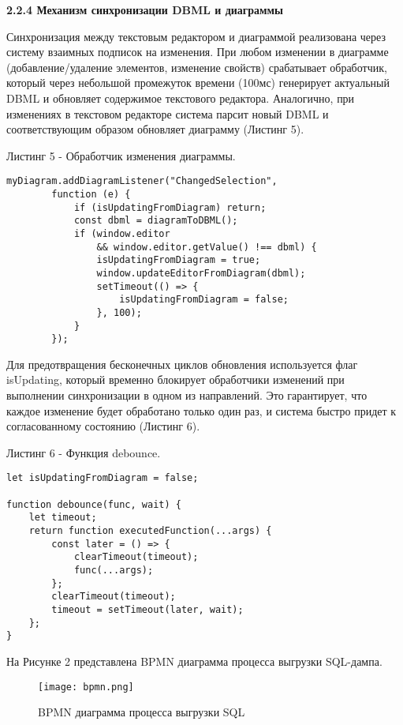 \textbf{\large 2.2.4 Механизм синхронизации DBML и диаграммы}

Синхронизация между текстовым редактором и диаграммой реализована через систему взаимных подписок на изменения. При любом изменении в диаграмме (добавление/удаление элементов, изменение свойств) срабатывает обработчик, который через небольшой промежуток времени (100мс) генерирует актуальный DBML и обновляет содержимое текстового редактора. Аналогично, при изменениях в текстовом редакторе система парсит новый DBML и соответствующим образом обновляет диаграмму (Листинг 5).

Листинг 5 - Обработчик изменения диаграммы.
\begin{lstlisting}[frame=single]
    myDiagram.addDiagramListener("ChangedSelection",
        function (e) {
            if (isUpdatingFromDiagram) return;
            const dbml = diagramToDBML();
            if (window.editor
                && window.editor.getValue() !== dbml) {
                isUpdatingFromDiagram = true;
                window.updateEditorFromDiagram(dbml);
                setTimeout(() => {
                    isUpdatingFromDiagram = false;
                }, 100);
            }
        });
\end{lstlisting}

Для предотвращения бесконечных циклов обновления используется флаг isUpdating, который временно блокирует обработчики изменений при выполнении синхронизации в одном из направлений. Это гарантирует, что каждое изменение будет обработано только один раз, и система быстро придет к согласованному состоянию (Листинг 6).

Листинг 6 - Функция debounce.
\begin{lstlisting}[frame=single]
let isUpdatingFromDiagram = false;

function debounce(func, wait) {
    let timeout;
    return function executedFunction(...args) {
        const later = () => {
            clearTimeout(timeout);
            func(...args);
        };
        clearTimeout(timeout);
        timeout = setTimeout(later, wait);
    };
}
\end{lstlisting}

На Рисунке 2 представлена BPMN диаграмма процесса выгрузки SQL-дампа.

\renewcommand{\figurename}{Рисунок}
\begin{figure}[htbp]
    \centering %
    \texttt{[image: bpmn.png]} 
    \caption{BPMN диаграмма процесса выгрузки SQL}
    \label{fig:analyze} %
\end{figure}

